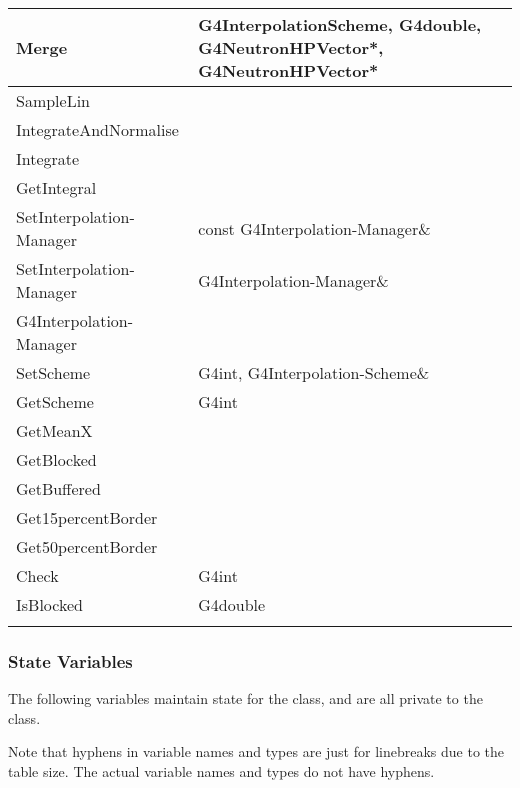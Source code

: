 \documentclass[12pt]{article}
\begin{document}
\begin{longtable}{p{}p{}p{}}
Merge & G4InterpolationScheme, G4double, G4NeutronHPVector*, G4NeutronHPVector* &\\\hline
SampleLin & & \\\hline
IntegrateAndNormalise & & \\\hline
Integrate & & \\\hline
GetIntegral & & \\\hline
SetInterpolation-Manager & const G4Interpolation-Manager\& &\\\hline
SetInterpolation-Manager & G4Interpolation-Manager\& & \\\hline
G4Interpolation-Manager & & \\\hline
SetScheme & G4int, G4Interpolation-Scheme\& & \\\hline
GetScheme & G4int & \\\hline
GetMeanX & & \\\hline
GetBlocked & & \\\hline
GetBuffered & & \\\hline
Get15percentBorder & &  \\\hline
Get50percentBorder & &  \\\hline
Check & G4int & \\\hline
IsBlocked & G4double & \\
\arrayrulecolor{black}
\bottomrule
\end{longtable}

\subsubsection{State Variables}%
The following variables maintain state for the class, and are all private to the class.

Note that hyphens in variable names and types are just for linebreaks due to the table size. The actual variable names and types do not have hyphens.
\end{document}
